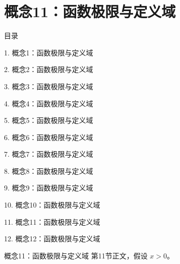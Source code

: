\documentclass[aspectratio=169,10pt,fontset=fandol]{ctexbeamer}
\begin{document}
\section{概念11：函数极限与定义域}
\begin{frame}[t,fragile]{目录}
\small
{\color{black}\small 1. 概念1：函数极限与定义域\par}\vspace{0.22em}
{\color{black}\small 2. 概念2：函数极限与定义域\par}\vspace{0.22em}
{\color{black}\small 3. 概念3：函数极限与定义域\par}\vspace{0.22em}
{\color{black}\small 4. 概念4：函数极限与定义域\par}\vspace{0.22em}
{\color{black}\small 5. 概念5：函数极限与定义域\par}\vspace{0.22em}
{\color{black}\small 6. 概念6：函数极限与定义域\par}\vspace{0.22em}
{\color{black}\small 7. 概念7：函数极限与定义域\par}\vspace{0.22em}
{\color{black}\small 8. 概念8：函数极限与定义域\par}\vspace{0.22em}
{\color{black}\small 9. 概念9：函数极限与定义域\par}\vspace{0.22em}
{\color{black}\small 10. 概念10：函数极限与定义域\par}\vspace{0.22em}
{\color{blue}\small 11. 概念11：函数极限与定义域\par}\vspace{0.22em}
{\color{gray!40}\small 12. 概念12：函数极限与定义域\par}\vspace{0.22em}
\end{frame}
\begin{frame}[t,fragile]{概念11：函数极限与定义域}
\normalsize
{\normalsize
第11节正文，假设 $x>0$。
}
\end{frame}
\end{document}
